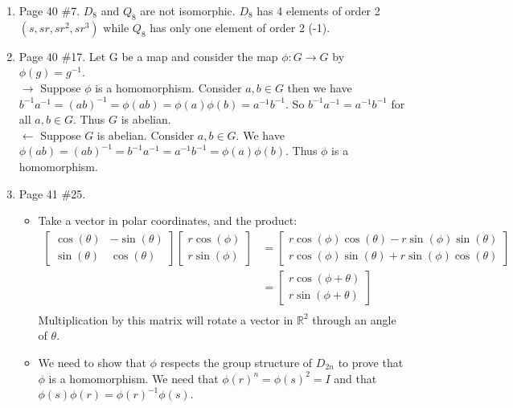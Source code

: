 \documentclass[12pt]{report}
\begin{document}
\begin{enumerate}
\item Page 40 \#7. $D_8$ and $Q_8$ are not isomorphic. $D_8$ has 4 elements of
      order 2 $(s,sr,sr^2,sr^3)$ while $Q_8$ has only one element of order 2
      (-1).\\

\item Page 40 \#17. Let G be a map and consider the map $\phi:G \to G$ by
      $\phi(g) = g^{-1}$.\\

      $\rightarrow$ Suppose $\phi$ is a homomorphism. Consider $a,b \in G$
      then we have $b^{-1}a^{-1} = (ab)^{-1} = \phi(ab) = \phi(a)\phi(b) =
      a^{-1}b^{-1}$. So $b^{-1}a^{-1} = a^{-1}b^{-1}$ for all $a,b \in G$. Thus
      $G$ is abelian.\\

      $\leftarrow$ Suppose $G$ is abelian. Consider $a,b \in G$. We have
      $\phi(ab) = (ab)^{-1} = b^{-1}a^{-1} = a^{-1}b^{-1} = \phi(a)\phi(b)$.
      Thus $\phi$ is a homomorphism.

\item Page 41 \#25.
  \begin{itemize}
  \item Take a vector in polar coordinates, and the product:
  \begin{align}
    \begin{bmatrix}
      \cos(\theta) & -\sin(\theta)\\
      \sin(\theta) & \cos(\theta)
    \end{bmatrix}
    \begin{bmatrix}
      r\cos(\phi)\\
      r\sin(\phi)
    \end{bmatrix}
    &= \begin{bmatrix}
      r\cos(\phi)\cos(\theta) - r\sin(\phi)\sin(\theta)\\
      r\cos(\phi)\sin(\theta) + r\sin(\phi)\cos(\theta)
    \end{bmatrix}\\
    &=\begin{bmatrix}
      r\cos(\phi+\theta)\\
      r\sin(\phi+\theta)
    \end{bmatrix}\\
  \end{align}
  Multiplication by this matrix will rotate a vector in $\mathbb{R}^2$ through
  an angle of $\theta$.

  \item We need to show that $\phi$ respects the group structure of $D_{2n}$ to
        prove that $\phi$ is a homomorphism. We need that $\phi(r)^n = \phi(s)^2
        = I$ and that $\phi(s)\phi(r) = \phi(r)^{-1}\phi(s)$.


\end{itemize}
\end{enumerate}
\end{document}
